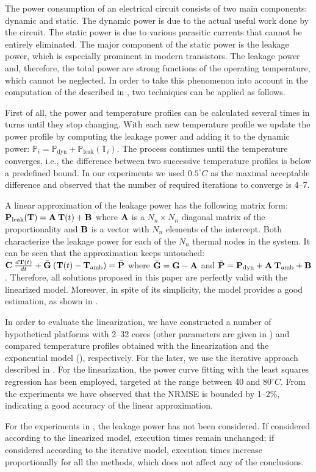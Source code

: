 The power consumption of an electrical circuit consists of two main components:
dynamic and static. The dynamic power is due to the actual useful work done by
the circuit. The static power is due to various parasitic currents that cannot
be entirely eliminated. The major component of the static power is the leakage
power, which is especially prominent in modern  transistors. The
leakage power and, therefore, the total power are strong functions of the
operating temperature, which cannot be neglected. In order to take this
phenomenon into account in the computation of the  described in
, two techniques can be applied as follows.

First of all, the power and temperature profiles can be calculated several times
in turns until they stop changing. With each new temperature profile we update
the power profile by computing the leakage power and adding it to the dynamic
power: $\mathbb{P}_i = \mathbb{P}_\text{dyn} +
\mathbb{P}_\text{leak}(\mathbb{T}_i)$. The process continues until the
temperature converges, i.e., the difference between two successive temperature
profiles is below a predefined bound. In our experiments we used $0.5^\circ C$
as the maximal acceptable difference and observed that the number of required
iterations to converge is 4--7.

A linear approximation of the leakage power has the following matrix form:
$\mathbf{P}_\text{leak}(\mathbf{T}) = \mathbf{A} \: \mathbf{T}(t) + \mathbf{B}$ where $\mathbf{A}$ is a $N_n
\times N_n$ diagonal matrix of the proportionality and $\mathbf{B}$ is a vector with
$N_n$ elements of the intercept. Both characterize the leakage power for each of
the $N_n$ thermal nodes in the system. It can be seen that the approximation
keeps  untouched: $\mathbf{C} \:
\frac{d\mathbf{T}(t)}{dt} + \bar{\mathbf{G}} \: (\mathbf{T}(t) - \mathbf{T}_{\mathrm{amb}}) = \bar{\mathbf{P}}$
where $\bar{\mathbf{G}} = \mathbf{G} - \mathbf{A}$ and $\bar{\mathbf{P}} = \mathbf{P}_\text{dyn} + \mathbf{A}
\: \mathbf{T}_{\mathrm{amb}} + \mathbf{B}$. Therefore, all solutions proposed in this paper are
perfectly valid with the linearized model. Moreover, in spite of its simplicity,
the model provides a good estimation, as shown in \cite{liu2007}.

In order to evaluate the linearization, we have constructed a number of
hypothetical platforms with 2--32 cores (other parameters are given in
) and compared temperature profiles obtained with the
linearization and the exponential model (), respectively. For
the later, we use the iterative approach described in
. For the linearization, the power curve
fitting with the least squares regression \cite{press2007} has been employed,
targeted at the range between 40 and $80^\circ C$. From the experiments we have
observed that the NRMSE is bounded by 1--2\%, indicating a good accuracy of the
linear approximation.

For the experiments in , the leakage power has
not been considered. If considered according to the linearized model, execution
times remain unchanged; if considered according to the iterative model,
execution times increase proportionally for all the methods, which does not
affect any of the conclusions.
